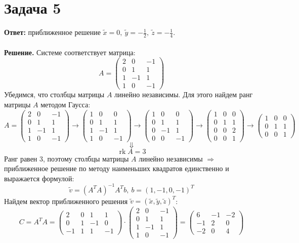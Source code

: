 \documentclass{article}
\DeclareMathOperator{\rank}{rk}
\begin{document}
\section*{Задача 5}
{\bf Ответ:} приближенное решение $\tilde x = 0,\ \tilde y = -\frac{1}{2},\ \tilde z = -\frac{1}{4}$.
\\
\\
{\bf Решение.} Системе соответствует матрица:
$$A=\left(\begin{array}{rrr}2 & 0 & -1\\0 & 1 &  1\\1 & -1 & 1\\1 & 0 & -1\end{array}\right)$$
Убедимся, что столбцы матрицы $A$ линейно независимы. Для этого найдем ранг матрицы $A$ методом Гаусса:
$$A=\left(\begin{array}{rrr}2 & 0 & -1\\0 & 1 &  1\\1 & -1 & 1\\1 & 0 & -1\end{array}\right)\rightarrow\left(\begin{array}{rrr}1 & 0 & 0\\0 & 1 &  1\\1 & -1 & 1\\1 & 0 & -1\end{array}\right)\rightarrow\left(\begin{array}{rrr}1 & 0 & 0\\0 & 1 &  1\\0 & -1 & 1\\0 & 0 & -1\end{array}\right)\rightarrow\left(\begin{array}{rrr}1 & 0 & 0\\0 & 1 &  1\\0 & 0 & 2\\0 & 0 & 1\end{array}\right)\rightarrow\left(\begin{array}{rrr}1 & 0 & 0\\0 & 1 &  1\\0 & 0 & 1\end{array}\right)$$
$$\Downarrow$$
$$\rank A = 3$$
Ранг равен 3, поэтому столбцы матрицы $A$ линейно независимы $\Rightarrow$ приближенное решение по методу наименьших квадратов единственно и выражается формулой:
$$\tilde v = (A^TA)^{-1}A^Tb,\ b=(1,-1,0,-1)^T$$
Найдем вектор приближенного решения $\tilde v = (\tilde x, \tilde y, \tilde z)^T$:
$$C=A^TA=\left(\begin{array}{rrrr}2 & 0 & 1 & 1\\0 & 1 & -1 & 0\\-1 & 1 & 1 & -1\end{array}\right)\cdot\left(\begin{array}{rrr}2 & 0 & -1\\0 & 1 &  1\\1 & -1 & 1\\1 & 0 & -1\end{array}\right)=\left(\begin{array}{rrr}6 & -1 & -2\\-1 & 2 & 0\\-2 & 0 & 4\end{array}\right)$$
\end{document}
